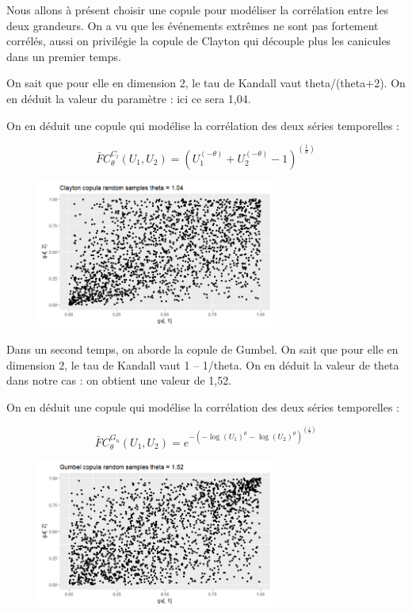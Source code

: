 \documentclass[../report.tex]{subfiles}
\begin{document}
\par Nous allons à présent choisir une copule pour modéliser la corrélation entre les deux grandeurs. On a vu que les événements extrêmes ne sont pas fortement corrélés, aussi on privilégie la copule de Clayton qui découple plus les canicules dans un premier temps.

\par On sait que pour elle en dimension 2, le tau de Kandall vaut theta/(theta+2). On en déduit la valeur du paramètre : ici ce sera 1,04.

\par On en déduit une copule qui modélise la corrélation des deux séries temporelles :

\begin{displaymath}
\bar{F} C_{\theta}^{C_l} (U_1,U_2)= \left(U_1^(-\theta)+U_2^(-\theta)-1 \right)^(\frac{1}{\theta})
\end{displaymath}

\begin{figure}[H]
  \centering
    \includegraphics[width=0.7\textwidth]{images/part_3/scatterclayton.png}
\end{figure}

\par Dans un second temps, on aborde la copule de Gumbel. On sait que pour elle en dimension 2, le tau de Kandall vaut 1 – 1/theta. On en déduit la valeur de theta dans notre cas : on obtient une valeur de 1,52.

\par On en déduit une copule qui modélise la corrélation des deux séries temporelles :

\begin{displaymath}
\bar{F} C_{\theta}^{G_u} (U_1,U_2)= e^{-(-\log(U_1 )^{\theta}-\log(U_2 )^{\theta} )^(\frac{1}{\theta})}
\end{displaymath}

\begin{figure}[H]
  \centering
    \includegraphics[width=0.7\textwidth]{images/part_3/scattergumbel.png}
\end{figure}
\end{document}

